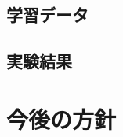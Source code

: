 \documentclass{suribt}
\begin{document}
\section{学習データ}

\section{実験結果}


\chapter{今後の方針}









\backmatter%
\end{document}
